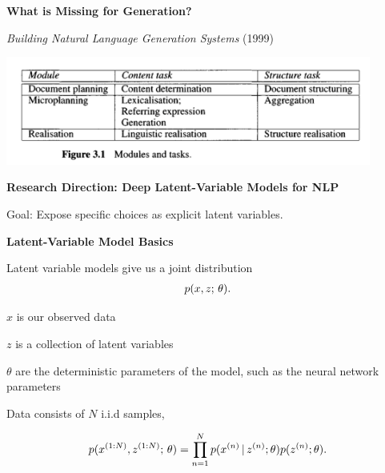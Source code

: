 \documentclass[aspectratio=169]{beamer}
\let\tempone\itemize
\let\temptwo\enditemize
\renewenvironment{itemize}{\tempone\addtolength{\itemsep}{0.5\baselineskip}}{\temptwo}
\begin{document}
\begin{frame}
  \begin{center}
    \textbf{ What is Missing for  Generation? }
  \end{center}

    \textit{Building Natural Language Generation Systems} (1999)

\vspace*{-1cm}
 \begin{center}
    \includegraphics[width =12cm]{datadoc}
  \end{center}
  \vspace*{-0.5cm}
\end{frame}

\begin{frame}
\begin{center}
    \textbf{Research Direction: Deep Latent-Variable Models for NLP }
  \end{center}
  Goal: Expose specific choices as explicit latent variables.

\end{frame}

\begin{frame}
\begin{center}
    \textbf{ Latent-Variable Model Basics }
  \end{center}

Latent variable models give us a joint distribution
\begin{align*}
p(x, z ; \, \theta).
\end{align*}

\pause
\begin{itemize}
    \item $x$ is our observed data
    \item $z$ is a collection of latent variables
    \item $\theta$ are the deterministic parameters of the model, such as the neural network parameters
\end{itemize}

\pause

\begin{itemize}
    \item Data consists of $N$ i.i.d samples,
\end{itemize}


                \[ p(x^{(1:N)}, z^{(1:N)} ; \, \theta ) = \prod_{n=1}^N p(x^{(n)} \,|\, z^{(n)}; \theta) p(z^{(n)};\theta). \]
\end{frame}
\end{document}
